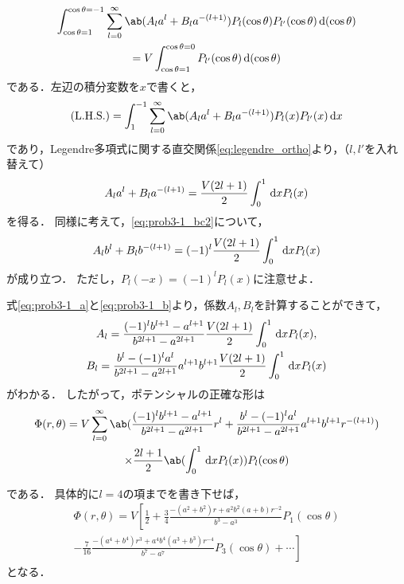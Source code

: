 \begin{multline}%
  \int_{\cos\theta=1}^{\cos\theta=-1} \sum_{l=0}^\infty\ab(A_la^l + B_la^{-(l+1)})
  P_l(\cos\theta) P_{l'}(\cos\theta) \dl{(\cos\theta)} \\
  =  V \int_{\cos\theta=1}^{\cos\theta=0} P_{l'}(\cos\theta) \dl{(\cos\theta)}
\end{multline}%
である．左辺の積分変数を$x$で書くと，
\begin{gather}%
  \text{(L.H.S.)} = \int_{1}^{-1} \sum_{l=0}^\infty\ab(A_l a^l + B_l a^{-(l+1)})
  P_l(x) P_{l'}(x) \dl{x}
\end{gather}
であり，Legendre多項式に関する直交関係\eqref{eq:legendre_ortho}より，（$l,l'$を入れ替えて）
\begin{gather}%
  \label{eq:prob3-1_a}
  A_l a^l + B_l a^{-(l+1)} = \frac{V(2l+1)}{2} \int_0^1 \dl{x} P_l(x)
\end{gather}%
を得る．
同様に考えて，\eqref{eq:prob3-1_bc2}について，
\begin{gather}%
  \label{eq:prob3-1_b}
  A_l b^l + B_l b^{-(l+1)} =(-1)^l \frac{V(2l+1)}{2} \int_0^{1} \dl{x} P_l(x)
\end{gather}%
が成り立つ．
ただし，$P_l(-x) = (-1)^l P_l(x)$に注意せよ．

式\eqref{eq:prob3-1_a}と\eqref{eq:prob3-1_b}より，係数$A_l, B_l$を計算することができて，
\begin{gather}%
  A_l = \frac{(-1)^lb^{l+1}-a^{l+1}}{b^{2l+1}-a^{2l+1}}
  \frac{V(2l+1)}{2} \int_0^1 \dl{x} P_l(x),\\
  B_l = \frac{b^l-(-1)^la^l}{b^{2l+1}-a^{2l+1}}a^{l+1}b^{l+1}
  \frac{V(2l+1)}{2}\int_0^1 \dl{x} P_l(x)
\end{gather}%
がわかる．
したがって，ポテンシャルの正確な形は
\begin{multline}
  \Phi(r,\theta) =
  V \sum_{l=0}^\infty \ab(
  \frac{(-1)^lb^{l+1}-a^{l+1}}{b^{2l+1}-a^{2l+1}} r^l +
  \frac{b^l-(-1)^la^l}{b^{2l+1}-a^{2l+1}}a^{l+1}b^{l+1} r^{-(l+1)}
  )\\
  \times\frac{2l+1}{2}\ab(\int_0^1 \dl{x} P_l(x))
  P_l(\cos\theta)
\end{multline}

である．
具体的に$l = 4$の項までを書き下せば，
\begin{multline}
  \Phi(r,\theta) = V \left[
    \frac{1}{2} + \frac{3}{4}\frac{-(a^2+b^2)r+a^2b^2(a+b)r^{-2}}{b^3-a^3} P_1(\cos\theta)\right.\\
    \left.
    -\frac{7}{16}\frac{-(a^4+b^4)r^3 + a^4b^4(a^3+b^3)r^{-4}}{b^7-a^7}P_3(\cos\theta) +\cdots
    \right]
\end{multline}
となる．

